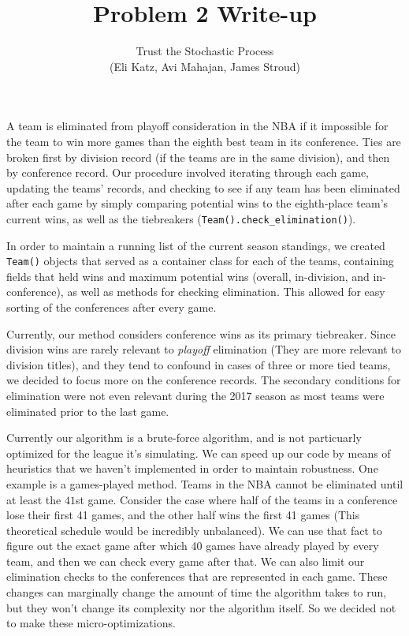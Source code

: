 \documentclass[12pt]{article}
\theoremstyle{nonumberplain}
\begin{document}
 
 
\title{Problem 2 Write-up}%
\author{Trust the Stochastic Process\\
        (Eli Katz, Avi Mahajan, James Stroud)}

\maketitle


A team is eliminated from playoff consideration in the NBA if it impossible for the team to win more games than the eighth best team in its conference. Ties are broken first by division record (if the teams are in the same division), and then by conference record. Our procedure involved iterating through each game, updating the teams' records, and checking to see if any team has been eliminated after each game by simply comparing potential wins to the eighth-place team's current wins, as well as the tiebreakers (\lstinline|Team().check_elimination()|).

In order to maintain a running list of the current season standings, we created \lstinline|Team()| objects that served as a container class for each of the teams, containing fields that held wins and maximum potential wins (overall, in-division, and in-conference), as well as methods for checking elimination. This allowed for easy sorting of the conferences after every game. 

Currently, our method considers conference wins as its primary tiebreaker. Since division wins are rarely relevant to \textit{playoff} elimination (They are more relevant to division titles), and they tend to confound in cases of three or more tied teams, we decided to focus more on the conference records. The secondary conditions for elimination were not even relevant during the 2017 season as most teams were eliminated prior to the last game.

Currently our algorithm is a brute-force algorithm, and is not particuarly optimized for the league it's simulating. We can speed up our code by means of heuristics that we haven't implemented in order to maintain robustness. One example is a games-played method. Teams in the NBA cannot be eliminated until at least the $41$st game. Consider the case where half of the teams in a conference lose their first 41 games, and the other half wins the first 41 games (This theoretical schedule would be incredibly unbalanced). We can use that fact to figure out the exact game after which 40 games have already played by every team, and then we can check every game after that. We can also limit our elimination checks to the conferences that are represented in each game. These changes can marginally change the amount of time the algorithm takes to run, but they won't change its complexity nor the algorithm itself. So we decided not to make these micro-optimizations.
\end{document}
